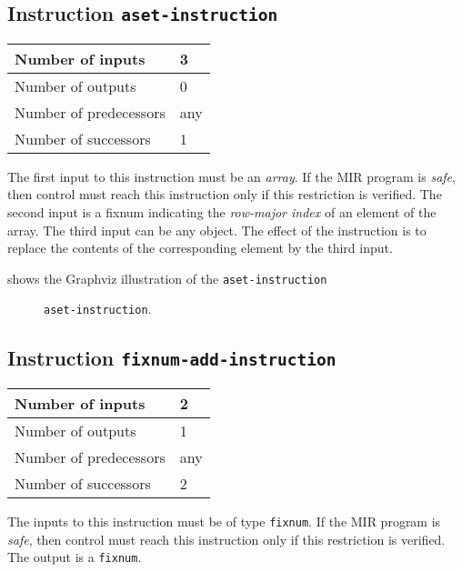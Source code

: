 \subsection{Instruction \texttt{aset-instruction}}
\label{mir-instruction-aset}

\begin{tabular}{|l|l|}
\hline
Number of inputs & 3\\
\hline
Number of outputs & 0\\
\hline
Number of predecessors & any\\
\hline
Number of successors & 1\\
\hline
\end{tabular}

The first input to this instruction must be an \emph{array}.  If the
MIR program is \emph{safe}, then control must reach this instruction
only if this restriction is verified.  The second input is a fixnum
indicating the \emph{row-major index} of an element of the array.
The third input can be any object.  The effect of the instruction is
to replace the contents of the corresponding element by the third input.

 shows the Graphviz illustration of the
\texttt{aset-instruction}

\begin{figure}
\begin{center}
\end{center}
\caption{\label{fig-aset-instruction}
\texttt{aset-instruction}.}
\end{figure}

\subsection{Instruction \texttt{fixnum-add-instruction}}
\label{mir-instruction-fixnum-add}

\begin{tabular}{|l|l|}
\hline
Number of inputs & 2\\
\hline
Number of outputs & 1\\
\hline
Number of predecessors & any\\
\hline
Number of successors & 2\\
\hline
\end{tabular}

The inputs to this instruction must be of type \texttt{fixnum}.  If the
MIR program is \emph{safe}, then control must reach this instruction
only if this restriction is verified.  The output is a
\texttt{fixnum}.  

